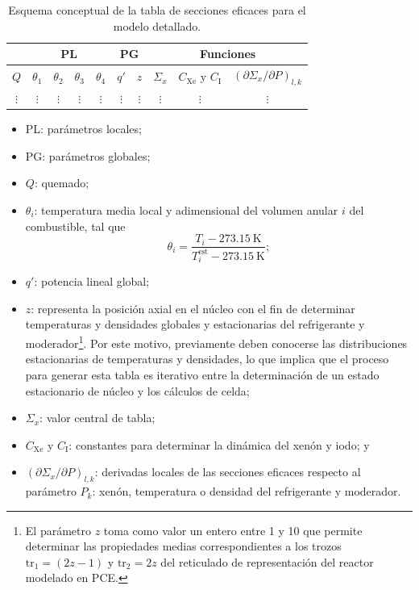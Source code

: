 \documentclass[11pt]{article}
\begin{document}
{
\begin{table}[h!]
\begin{center}
\begin{tabular}{|c|c|c|c|c|c|c|c|c|c|}
\hline
         & \multicolumn{4}{c|}{PL}                  & \multicolumn{2}{c|}{PG} & \multicolumn{3}{c|}{Funciones}\\
\hline
$Q$      & $\theta_{1}$ & $\theta_{2}$ & $\theta_{3}$ & $\theta_{4}$ & $q\prime$      & $z$      & $\Sigma_x$ & $C_{\text{Xe}}$ y $C_{\text{I}}$ & $\left( \partial\Sigma_x / \partial P \right)_{l,k}$\\
\hline
$\vdots$ & $\vdots$     & $\vdots$     & $\vdots$     & $\vdots$     & $\vdots$  & $\vdots$ & $\vdots$   & $\vdots$                         & $\vdots$\\
\hline
\end{tabular}
\caption{\label{table:modelo-detallado} Esquema conceptual de la tabla de secciones eficaces para el modelo detallado.}
\end{center}
\end{table}
}

\begin{itemize}
\renewcommand\labelitemi{$\cdot$}
 \item PL: parámetros locales;
 \item PG: parámetros globales;
 \item $Q$: quemado;
 \item $\theta_i$: temperatura media local y adimensional del volumen anular $i$ del combustible, tal que
 \begin{equation*}
  \theta_i = \frac{T_i - \SI{273.15}{\kelvin}}{T^{\text{est}}_i - \SI{273.15}{\kelvin}};
 \end{equation*}
 \item $q\prime$: potencia lineal global;
 \item $z$: representa la posición axial en el núcleo con el fin de determinar temperaturas y densidades globales y estacionarias del refrigerante y moderador{\footnote{El parámetro $z$ toma como valor un entero entre \num{1} y \num{10} que permite determinar las propiedades medias correspondientes a los trozos $\text{tr}_1 = \left( 2z-1 \right)$ y $\text{tr}_2 = 2z$ del reticulado de representación del reactor modelado en PCE.}}. Por este motivo, previamente deben conocerse las distribuciones estacionarias de temperaturas y densidades, lo que implica que el proceso para generar esta tabla es iterativo entre la determinación de un estado estacionario de núcleo y los cálculos de celda;
 \item $\Sigma_x$: valor central de tabla;
 \item $C_{\text{Xe}}$ y $C_{\text{I}}$: constantes para determinar la dinámica del xenón y iodo; y
 \item $\left( \partial\Sigma_x / \partial P \right)_{l,k}$: derivadas locales de las secciones eficaces respecto al parámetro $P_k$: xenón, temperatura o densidad del refrigerante y moderador.
\end{itemize}
\end{document}
